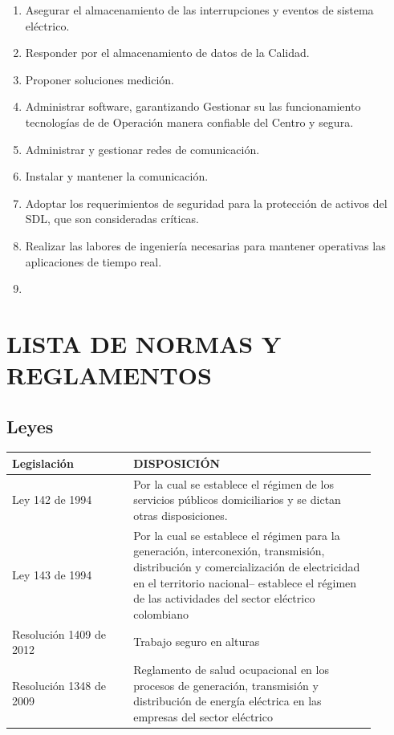 \documentclass[a5paper]{book}%
\begin{document}
\begin{enumerate}
\item Asegurar el almacenamiento de las interrupciones  y eventos  de sistema eléctrico.
\item Responder  por el almacenamiento de datos de la Calidad.
\item Proponer  soluciones medición.
\item Administrar  software, garantizando Gestionar su las funcionamiento tecnologías de de Operación manera confiable del Centro  y segura.
\item  Administrar y gestionar redes de comunicación.
\item Instalar  y mantener  la comunicación.
\item Adoptar los requerimientos de seguridad para la protección de activos del \ac{SDL},  que son consideradas críticas.
\item Realizar las labores de ingeniería necesarias para mantener operativas las aplicaciones  de tiempo real.
\item 
    \end{enumerate}
  
    \chapter{LISTA DE NORMAS Y REGLAMENTOS}

    \section{Leyes}

\begin{tabular}{|p{0.3\linewidth}|p{0.6\linewidth}|}
  \hline
  Legislación & DISPOSICIÓN \\\hline
  Ley 142 de 1994& Por la cual se establece el régimen de los servicios públicos domiciliarios y se dictan otras disposiciones.\\\hline
Ley 143 de 1994& Por la cual se establece el régimen para la generación, interconexión, transmisión, distribución y comercialización de electricidad en el territorio nacional– establece el régimen de las actividades del sector eléctrico colombiano\\\hline
  Resolución 1409 de 2012  & Trabajo seguro en alturas \\\hline
  Resolución 1348 de 2009 & Reglamento de salud ocupacional
en los procesos de generación, transmisión y distribución de
energía eléctrica en las empresas del sector eléctrico \\\hline
\end{tabular}
\end{document}
